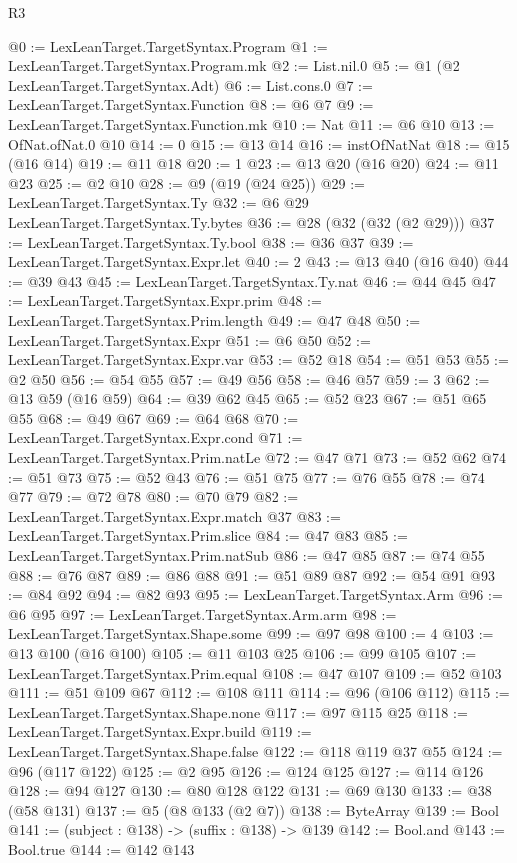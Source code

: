 \begin{lexlean}{R3}
\begin{coremodule}
@0 := LexLeanTarget.TargetSyntax.Program
@1 := LexLeanTarget.TargetSyntax.Program.mk
@2 := List.nil.{0}
@5 := @1 (@2 LexLeanTarget.TargetSyntax.Adt)
@6 := List.cons.{0}
@7 := LexLeanTarget.TargetSyntax.Function
@8 := @6 @7
@9 := LexLeanTarget.TargetSyntax.Function.mk
@10 := Nat
@11 := @6 @10
@13 := OfNat.ofNat.{0} @10
@14 := 0
@15 := @13 @14
@16 := instOfNatNat
@18 := @15 (@16 @14)
@19 := @11 @18
@20 := 1
@23 := @13 @20 (@16 @20)
@24 := @11 @23
@25 := @2 @10
@28 := @9 (@19 (@24 @25))
@29 := LexLeanTarget.TargetSyntax.Ty
@32 := @6 @29 LexLeanTarget.TargetSyntax.Ty.bytes
@36 := @28 (@32 (@32 (@2 @29)))
@37 := LexLeanTarget.TargetSyntax.Ty.bool
@38 := @36 @37
@39 := LexLeanTarget.TargetSyntax.Expr.let
@40 := 2
@43 := @13 @40 (@16 @40)
@44 := @39 @43
@45 := LexLeanTarget.TargetSyntax.Ty.nat
@46 := @44 @45
@47 := LexLeanTarget.TargetSyntax.Expr.prim
@48 := LexLeanTarget.TargetSyntax.Prim.length
@49 := @47 @48
@50 := LexLeanTarget.TargetSyntax.Expr
@51 := @6 @50
@52 := LexLeanTarget.TargetSyntax.Expr.var
@53 := @52 @18
@54 := @51 @53
@55 := @2 @50
@56 := @54 @55
@57 := @49 @56
@58 := @46 @57
@59 := 3
@62 := @13 @59 (@16 @59)
@64 := @39 @62 @45
@65 := @52 @23
@67 := @51 @65 @55
@68 := @49 @67
@69 := @64 @68
@70 := LexLeanTarget.TargetSyntax.Expr.cond
@71 := LexLeanTarget.TargetSyntax.Prim.natLe
@72 := @47 @71
@73 := @52 @62
@74 := @51 @73
@75 := @52 @43
@76 := @51 @75
@77 := @76 @55
@78 := @74 @77
@79 := @72 @78
@80 := @70 @79
@82 := LexLeanTarget.TargetSyntax.Expr.match @37
@83 := LexLeanTarget.TargetSyntax.Prim.slice
@84 := @47 @83
@85 := LexLeanTarget.TargetSyntax.Prim.natSub
@86 := @47 @85
@87 := @74 @55
@88 := @76 @87
@89 := @86 @88
@91 := @51 @89 @87
@92 := @54 @91
@93 := @84 @92
@94 := @82 @93
@95 := LexLeanTarget.TargetSyntax.Arm
@96 := @6 @95
@97 := LexLeanTarget.TargetSyntax.Arm.arm
@98 := LexLeanTarget.TargetSyntax.Shape.some
@99 := @97 @98
@100 := 4
@103 := @13 @100 (@16 @100)
@105 := @11 @103 @25
@106 := @99 @105
@107 := LexLeanTarget.TargetSyntax.Prim.equal
@108 := @47 @107
@109 := @52 @103
@111 := @51 @109 @67
@112 := @108 @111
@114 := @96 (@106 @112)
@115 := LexLeanTarget.TargetSyntax.Shape.none
@117 := @97 @115 @25
@118 := LexLeanTarget.TargetSyntax.Expr.build
@119 := LexLeanTarget.TargetSyntax.Shape.false
@122 := @118 @119 @37 @55
@124 := @96 (@117 @122)
@125 := @2 @95
@126 := @124 @125
@127 := @114 @126
@128 := @94 @127
@130 := @80 @128 @122
@131 := @69 @130
@133 := @38 (@58 @131)
@137 := @5 (@8 @133 (@2 @7))
@138 := ByteArray
@139 := Bool
@141 := (subject : @138) -> (suffix : @138) -> @139
@142 := Bool.and
@143 := Bool.true
@144 := @142 @143

\end{coremodule}
\end{lexlean}
